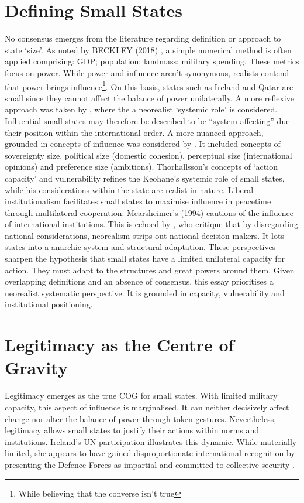 \section*{Defining Small States}
No consensus emerges from the literature regarding definition or approach to state `size'. As noted by BECKLEY (2018) \nocite{BECKLEY_2018,CROWARDS_2002}, a simple numerical method is often applied comprising: GDP; population; landmass; military spending. These metrics focus on power. While power and influence aren't synonymous, realists contend that power brings influence\footnote{While believing that the converse isn't true}. On this basis, states such as Ireland  and Qatar are small since they cannot affect the balance of power unilaterally. A more reflexive approach was taken by \textcite{KEOHANE_1969}, where the a neorealist `systemic role' is considered.  Influential small states may therefore be described to be ``system affecting'' due their position within the international order. A more nuanced approach, grounded in concepts of influence was considered by \textcite{THORHALLSSON_2006}. It included concepts of sovereignty size, political size (domestic cohesion), perceptual size (international opinions) and preference size (ambitions). Thorhallsson's concepts of `action capacity' and vulnerability refines the Keohane's systemic role of small states, while his considerations within the state are realist in nature. Liberal institutionalism facilitates small states to maximise influence in peacetime through multilateral cooperation\parencite{FARRELL_2019}. Mearsheimer's (1994) cautions of the influence of international institutions. This is echoed by \textcite{BESSNER_2015}, who critique that by disregarding national considerations, neorealism strips out national decision makers. It lots states into a anarchic system and structural adaptation. These perspectives sharpen the hypothesis that small states have a limited unilateral capacity for action. They must adapt to the structures and great powers around them. Given overlapping definitions and an absence of consensus, this essay prioritises a neorealist systematic perspective. It is grounded in capacity, vulnerability and institutional positioning.

\section*{Legitimacy as the Centre of Gravity}
Legitimacy emerges as the true COG for small states. With limited military capacity, this aspect of influence is marginalised. It can neither decisively affect change nor alter the balance of power through token gestures. Nevertheless, legitimacy allows small states to justify their actions within norms and institutions. Ireland's UN participation illustrates this dynamic. While materially limited, she appears to have gained disproportionate international recognition by presenting the Defence Forces as impartial and committed to collective security \parencite{ROTHSTEIN_1968}.

